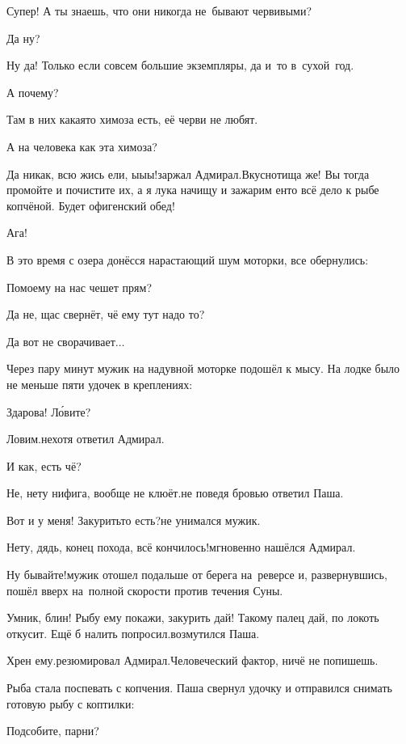 \diagdash Супер! А ты знаешь, что они никогда не~бывают червивыми?

\diagdash Да ну?

\diagdash Ну да! Только если совсем большие экземпляры, да и~то в~сухой~год.

\diagdash А почему?

\diagdash Там в них какая\sdash то химоза есть, её черви не любят.

\diagdash А на человека как эта химоза?

\diagdash Да никак, всю жись ели, ы\sdash ы\sdash ы!\mdash заржал Адмирал.\mdash Вкуснотища же! Вы тогда промойте и почистите их, а я лука начищу и зажарим енто всё дело к рыбе копчёной. Будет офигенский обед!

\diagdash Ага!

В это время с озера донёсся нарастающий шум моторки, все обернулись:

\diagdash По\sdash моему на нас чешет прям?

\diagdash Да не, щас свернёт, чё ему тут надо то?

\diagdash Да вот не сворачивает$\ldots$

Через пару минут мужик на надувной моторке подошёл к мысу. На лодке было не меньше пяти удочек в креплениях:

\diagdash Здарова! Л\'{о}вите?

\diagdash Ловим.\mdash нехотя ответил Адмирал.

\diagdash И как, есть чё?

\diagdash Не, нету нифига, вообще не клюёт.\mdash не поведя бровью ответил Паша.

\diagdash Вот и у меня! Закурить\sdash то есть?\mdash не унимался мужик.

\diagdash Нету, дядь, конец похода, всё кончилось!\mdash мгновенно нашёлся Адмирал.

\diagdash Ну бывайте!\mdash мужик отошел подальше от берега на~реверсе и, развернувшись, пошёл вверх на~полной скорости против течения Суны. 

\diagdash Умник, блин! Рыбу ему покажи, закурить дай! Такому палец дай, по локоть откусит. Ещё б налить попросил.\mdash возмутился Паша.

\diagdash Хрен ему.\mdash резюмировал Адмирал.\mdash Человеческий фактор, ничё не попишешь.

Рыба стала поспевать с копчения. Паша свернул удочку и отправился снимать готовую рыбу с коптилки:

\diagdash Подсобите, парни?

